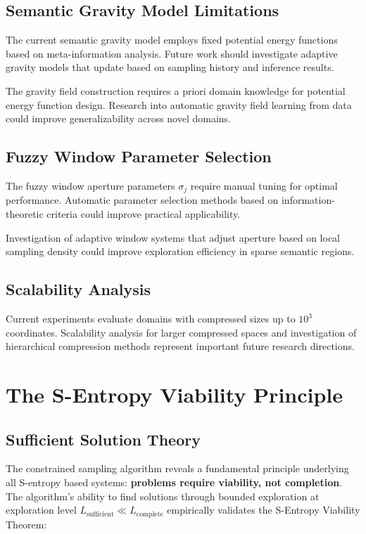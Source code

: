 \documentclass[12pt,a4paper]{article}
\begin{document}
\begin{table}[h]
\subsection{Semantic Gravity Model Limitations}

The current semantic gravity model employs fixed potential energy functions based on meta-information analysis. Future work should investigate adaptive gravity models that update based on sampling history and inference results.

The gravity field construction requires a priori domain knowledge for potential energy function design. Research into automatic gravity field learning from data could improve generalizability across novel domains.

\subsection{Fuzzy Window Parameter Selection}

The fuzzy window aperture parameters $\sigma_j$ require manual tuning for optimal performance. Automatic parameter selection methods based on information-theoretic criteria could improve practical applicability.

Investigation of adaptive window systems that adjust aperture based on local sampling density could improve exploration efficiency in sparse semantic regions.

\subsection{Scalability Analysis}

Current experiments evaluate domains with compressed sizes up to $10^3$ coordinates. Scalability analysis for larger compressed spaces and investigation of hierarchical compression methods represent important future research directions.

\section{The S-Entropy Viability Principle}

\subsection{Sufficient Solution Theory}

The constrained sampling algorithm reveals a fundamental principle underlying all S-entropy based systems: \textbf{problems require viability, not completion}. The algorithm's ability to find solutions through bounded exploration at exploration level $L_{\text{sufficient}} \ll L_{\text{complete}}$ empirically validates the S-Entropy Viability Theorem:


\end{table}
\end{document}
